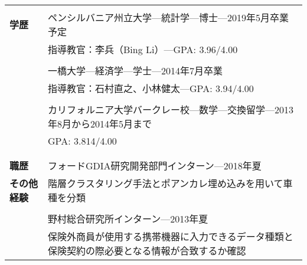 \documentclass[utf8,letterpaper,oneside]{article}
\begin{document}
\begin{center}
 \begin{tabular}{l l}
  \hline
                      &                                                                                                \\
  \textbf{学歴}       & ペンシルバニア州立大学---統計学---博士---2019年5月卒業予定                                     \\
                      & 指導教官：李兵（Bing Li）---GPA: 3.96/4.00                                                     \\
                      &                                                                                                \\
                      & 一橋大学---経済学---学士---2014年7月卒業                                                       \\
                      & 指導教官：石村直之、小林健太---GPA: 3.94/4.00                                                  \\
                      &                                                                                                \\
                      & カリフォルニア大学バークレー校---数学---交換留学---2013年8月から2014年5月まで                  \\
                      & GPA: 3.814/4.00                                                                                \\
                      &                                                                                                \\ \hline
                      &                                                                                                \\
  \textbf{職歴}       & フォードGDIA研究開発部門インターン---2018年夏                                                  \\
  \textbf{その他経験} & 階層クラスタリング手法とポアンカレ埋め込みを用いて車種を分類                                   \\
                      &                                                                                                \\
                      & 野村総合研究所インターン---2013年夏                                                            \\
                      & 保険外商員が使用する携帯機器に入力できるデータ種類と保険契約の際必要となる情報が合致するか確認 \\

\end{tabular}
\end{center}
\end{document}
